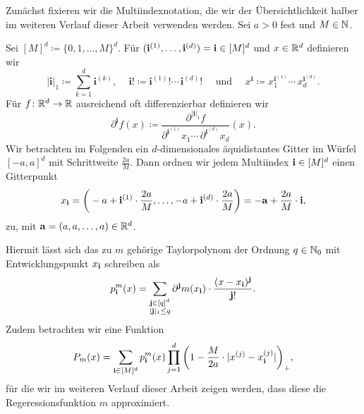 Zunächst fixieren wir die Multiindexnotation, die wir der Übersichtlichkeit halber im weiteren Verlauf dieser Arbeit verwenden werden. Sei $a > 0$ fest und $M \in \mathbb{N}$. 

Sei $[M]^d \coloneqq\{0, 1, \dots, M\}^d.$ 
Für $(\mathbf{i}^{(1)},\dots,\mathbf{i}^{(d)}) = \mathbf{i} \in [M]^d$ und $x \in \mathbb{R}^d$ definieren wir
$$|\mathbf{i}|_1 \coloneqq \sum_{k= 1}^d \mathbf{i}^{(k)} \text{, } \quad \mathbf{i}! \coloneqq \mathbf{i}^{(1)}! \cdots \, \mathbf{i}^{(d)}! \quad \text{ und } \quad x^{\mathbf{i}} \coloneqq x_1^{\mathbf{i}^{(1)}} \cdots \,    x_d^{\mathbf{i}^{(d)}}.$$
Für $f\colon \mathbb{R}^d \to \mathbb{R}$ ausreichend oft differenzierbar definieren wir 
$$\partial^{\mathbf{i}}f(x) \coloneqq \frac{\partial^{|\mathbf{i}|_1}f}{\partial^{\mathbf{i}^{(1)}} x_1 \cdots \, \partial^{\mathbf{i}^{(d)}} x_d} (x).$$
Wir betrachten im Folgenden ein $d$-dimensionales äquidistantes Gitter im Würfel $[-a, a]^d$ mit Schrittweite $\frac{2a}{M}.$ 
Dann ordnen wir jedem Multiindex $\mathbf{i} \in [M]^d$ einen Gitterpunkt
\begin{equation}
\label{eq:gitter}
x_{\mathbf{i}} = \bigg( -a + \mathbf{i}^{(1)} \cdot \frac{2a}{M},\dots, -a + \mathbf{i}^{(d)} \cdot \frac{2a}{M}\bigg) = -\mathbf{a} + \frac{2a}{M} \cdot \mathbf{i},
\end{equation}
zu, mit $\mathbf{a} = (a, a, \dots, a) \in \mathbb{R}^d$.

Hiermit lässt sich das zu $m$ gehörige Taylorpolynom der Ordnung $q \in \mathbb{N}_0$ mit Entwicklungspunkt $x_{\mathbf{i}}$ schreiben als
$$p_{\mathbf{i}}^m(x) = \sum_{\substack{\mathbf{j} \in [q]^d \\|\mathbf{j}|_1 \leq q}} \partial^{\mathbf{j}}m(x_{\mathbf{i}}) \cdot \frac{(x - x_{\mathbf{i}})^{\mathbf{j}}}{\mathbf{j}!}.$$
Zudem betrachten wir eine Funktion
\begin{equation}
\label{konvexkomb}
P_m(x) = \sum_{\mathbf{i} \in [M]^d} p_{\mathbf{i}}^m(x) \prod_{j = 1}^{d} \bigg(1 - \frac{M}{2a} \cdot |x^{(j)} - x_{\mathbf{i}}^{(j)}|\bigg)_+,
\end{equation}
für die wir im weiteren Verlauf dieser Arbeit zeigen werden, dass diese die Regeressionsfunktion $m$ approximiert.

